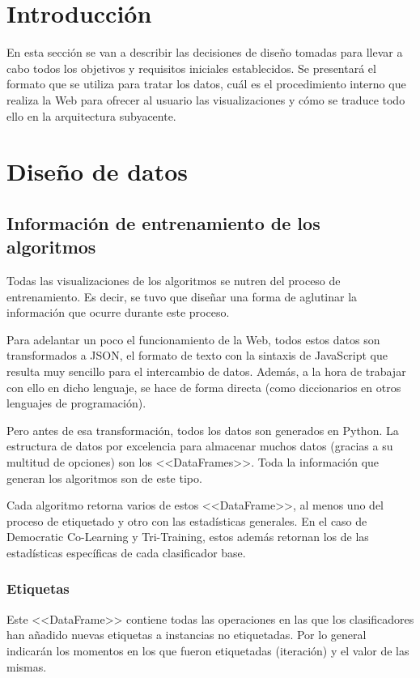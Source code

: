 
\section{Introducción}

En esta sección se van a describir las decisiones de diseño tomadas para llevar
a cabo todos los objetivos y requisitos iniciales establecidos. Se presentará el
formato que se utiliza para tratar los datos, cuál es el procedimiento interno
que realiza la Web para ofrecer al usuario las visualizaciones y cómo se traduce
todo ello en la arquitectura subyacente.

\section{Diseño de datos}

\subsection{Información de entrenamiento de los algoritmos}
\label{datos:entrenamiento}
Todas las visualizaciones de los algoritmos se nutren del proceso de
entrenamiento. Es decir, se tuvo que diseñar una forma de aglutinar la
información que ocurre durante este proceso.

Para adelantar un poco el funcionamiento de la Web, todos estos datos son
transformados a JSON, el formato de texto con la sintaxis de JavaScript que
resulta muy sencillo para el intercambio de datos. Además, a la hora de trabajar
con ello en dicho lenguaje, se hace de forma directa (como diccionarios en otros
lenguajes de programación).

Pero antes de esa transformación, todos los datos son generados en Python. La
estructura de datos por excelencia para almacenar muchos datos (gracias a su
multitud de opciones) son los <<DataFrames>>. Toda la información que generan
los algoritmos son de este tipo.

Cada algoritmo retorna varios de estos <<DataFrame>>, al menos uno del proceso
de etiquetado y otro con las estadísticas generales. En el caso de Democratic
Co-Learning y Tri-Training, estos además retornan los de las estadísticas
específicas de cada clasificador base.

\subsubsection{Etiquetas}
Este <<DataFrame>> contiene todas las operaciones en las que los clasificadores
han añadido nuevas etiquetas a instancias no etiquetadas. Por lo general
indicarán los momentos en los que fueron etiquetadas (iteración) y el valor de
las mismas.

